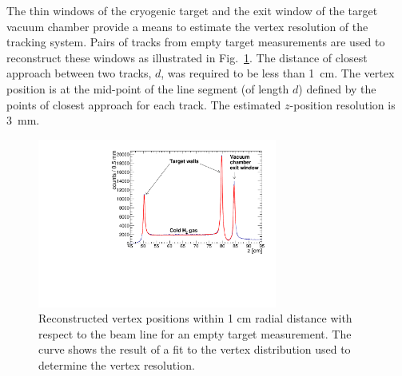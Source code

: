 The thin windows of the cryogenic target and the exit window of the target
vacuum chamber provide a means to estimate the 
vertex resolution of the tracking system.  Pairs of tracks from empty target measurements are used to reconstruct these windows as illustrated in 
Fig.~\ref{fig:z-vertex}. The distance of closest approach between two tracks, $d$, was required to be less than 1~cm. The vertex position 
is at the mid-point of the line segment (of length $d$) defined by the points of closest approach for each track.
The estimated $z$-position resolution is 3~mm.

\begin{figure}[tbp]
\begin{center}
\includegraphics[width=0.7\textwidth]{figures/ZVertex.pdf}  
\caption{\label{fig:z-vertex} Reconstructed vertex positions within 1 cm radial
 distance with respect to the beam line for an empty target measurement.  The curve shows the result of a fit to the vertex distribution used to determine the vertex
resolution. 
}   
\end{center}  
\end{figure}

